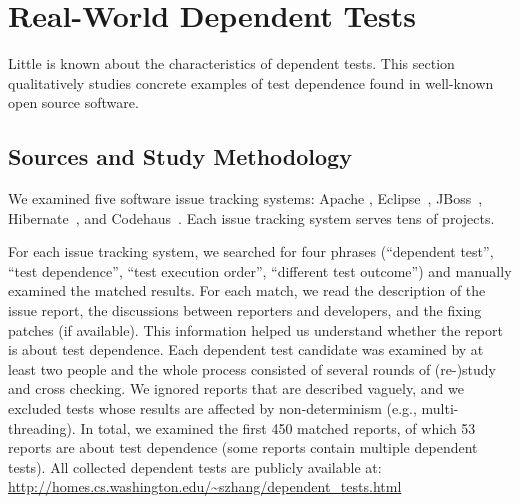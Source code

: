 \section{Real-World Dependent Tests}
\label{sec:study}

\newcommand{\unum}{{{14}}\xspace}
\newcommand{\svratio}{{{61}}}
\newcommand{\svnum}{{{59}}\xspace}
\newcommand{\unfixed}{{{58}}\xspace}


Little is known about the characteristics of dependent tests.
This section qualitatively studies
concrete examples of test dependence found in
well-known open source software. 


\subsection{Sources and Study Methodology}

We examined five
software issue
tracking systems: Apache \cite{apachebug},
Eclipse~\cite{eclipsebug}, JBoss~\cite{jbossbug},
Hibernate~\cite{hibernatebug}, and Codehaus~\cite{codehausbug}.
Each issue tracking system serves tens of projects.



For each issue tracking system, we searched for four phrases
(``dependent test'', ``test dependence'', ``test execution order'',
``different test outcome'') and manually examined the matched results. For each match, we read the
description of the issue report, the discussions between reporters
and developers, and the fixing patches (if available). This information
helped us understand whether the report is about test dependence.
Each dependent test candidate was examined by
at least two people and the whole process consisted of several
rounds of (re-)study and cross checking. We ignored reports
that are described vaguely, and we excluded tests whose results are
affected by non-determinism (e.g., multi-threading).
In total, we examined the first 450 matched reports, of which 53
reports are about test dependence (some reports contain multiple
dependent tests).
All collected dependent tests are publicly available 
at: \url{http://homes.cs.washington.edu/~szhang/dependent\_tests.html}


